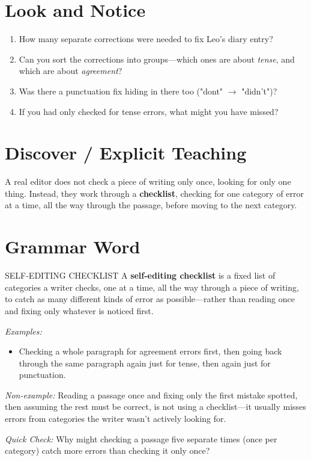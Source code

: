 \section{Look and Notice}
\begin{thinkbox}
\begin{enumerate}
    \item How many separate corrections were needed to fix Leo's diary entry?
    \item Can you sort the corrections into groups—which ones are about \textit{tense}, and which are about \textit{agreement}?
    \item Was there a punctuation fix hiding in there too ("dont" $\rightarrow$ "didn't")?
    \item If you had only checked for tense errors, what might you have missed?
\end{enumerate}
\end{thinkbox}

\section{Discover / Explicit Teaching}
A real editor does not check a piece of writing only once, looking for only one thing. Instead, they work through a \textbf{checklist}, checking for one category of error at a time, all the way through the passage, before moving to the next category.

\section{Grammar Word}
\begin{grammarword}{SELF-EDITING CHECKLIST}
A \textbf{self-editing checklist} is a fixed list of categories a writer checks, one at a time, all the way through a piece of writing, to catch as many different kinds of error as possible—rather than reading once and fixing only whatever is noticed first.

\textit{Examples:}
\begin{itemize}
    \item Checking a whole paragraph for agreement errors first, then going back through the same paragraph again just for tense, then again just for punctuation.
\end{itemize}

\textit{Non-example:} Reading a passage once and fixing only the first mistake spotted, then assuming the rest must be correct, is not using a checklist—it usually misses errors from categories the writer wasn't actively looking for.

\textit{Quick Check:} Why might checking a passage five separate times (once per category) catch more errors than checking it only once?
\end{grammarword}

